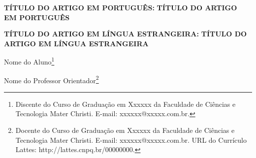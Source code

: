 \newcommand{\TITULOP}{TÍTULO DO ARTIGO EM PORTUGUÊS}
\newcommand{\TITULOE}{TÍTULO DO ARTIGO EM LÍNGUA ESTRANGEIRA}
\newcommand{\AUTOR}{Nome do Aluno}
\newcommand{\AUTORCURRICULO}{Discente do Curso de Graduação em Xxxxxx da
Faculdade de Ciências e Tecnologia Mater Christi. E-mail: xxxxxx@xxxxx.com.br.}
\newcommand{\ORIENTADOR}{Nome do Professor Orientador}
\newcommand{\ORIENTADORCURRICULO}{Docente do Curso de Graduação em Xxxxxx da
Faculdade de Ciências e Tecnologia Mater Christi. E-mail: xxxxxx@xxxxx.com.br.
URL do Currículo Lattes: http://lattes.cnpq.br/00000000.}

\begin{onehalfspace}
  \begin{center}
    \ifdefined\SUBTITULOP
      \textbf{\TITULOP: \SUBTITULOP}
    \else
      \textbf{\TITULOP}
    \fi

    \ifdefined\SUBTITULOE
      \textbf{\TITULOE: \SUBTITULOE}
    \else
      \textbf{\TITULOE}
    \fi
  \end{center}
  \begin{flushright}
    \AUTOR\footnote{\AUTORCURRICULO}

    \ORIENTADOR\footnote{\ORIENTADORCURRICULO}
  \end{flushright}
\end{onehalfspace}
